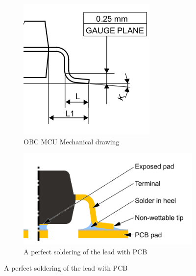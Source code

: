 \documentclass[final]{cubedoc}
\begin{document}
\begin{figure}[h!]
\centering
\begin{subfigure}{.5\textwidth}
  \centering
  \includegraphics[width=0.7\linewidth]{docs/gullwing_leads.png}
  \caption{OBC MCU Mechanical drawing}
  \label{fig:sub1}
\end{subfigure}%
\begin{subfigure}{.5\textwidth}
  \centering
  \includegraphics[keepaspectratio, width=1.3\linewidth, height=.4\textheight]{docs/gullwing_solder.png}
  \caption{A perfect soldering of the lead with PCB}
  \label{fig:sub2}
\end{subfigure}
\label{fig:test}
\end{figure}

\end{document}
